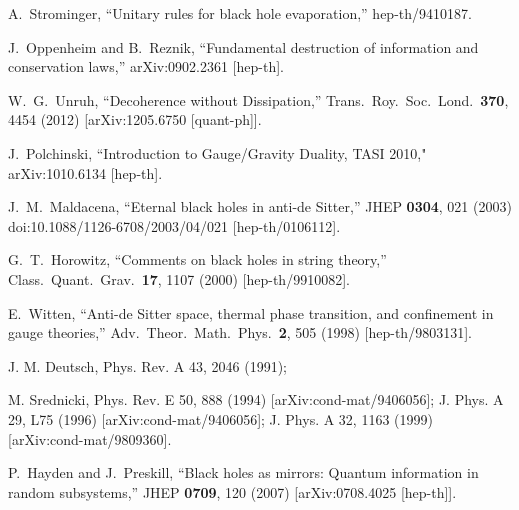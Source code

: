 \documentclass[12pt]{article}
\begin{document}
\begin{thebibliography}{99}
  
  A.~Strominger,
  ``Unitary rules for black hole evaporation,''
  hep-th/9410187. 
    
  J.~Oppenheim and B.~Reznik,
  ``Fundamental destruction of information and conservation laws,''
  arXiv:0902.2361 [hep-th].
 
  W.~G.~Unruh,
  ``Decoherence without Dissipation,''
  Trans.\ Roy.\ Soc.\ Lond.\  {\bf 370}, 4454 (2012)
  [arXiv:1205.6750 [quant-ph]].
  
  J.~Polchinski,
  ``Introduction to Gauge/Gravity Duality, TASI 2010,"
   arXiv:1010.6134 [hep-th].
  
  
  J.~M.~Maldacena,
  ``Eternal black holes in anti-de Sitter,''
  JHEP {\bf 0304}, 021 (2003)
  doi:10.1088/1126-6708/2003/04/021
  [hep-th/0106112].
  
  G.~T.~Horowitz,
  ``Comments on black holes in string theory,''
  Class.\ Quant.\ Grav.\  {\bf 17}, 1107 (2000)
  [hep-th/9910082].
  
  E.~Witten,
  ``Anti-de Sitter space, thermal phase transition, and confinement in gauge theories,''
  Adv.\ Theor.\ Math.\ Phys.\  {\bf 2}, 505 (1998)
  [hep-th/9803131].
  
J. M. Deutsch, Phys. Rev. A 43, 2046 (1991);

M. Srednicki, Phys. Rev. E 50, 888 (1994) [arXiv:cond-mat/9406056]; J. Phys. A 29, L75 (1996)
[arXiv:cond-mat/9406056]; J. Phys. A 32, 1163 (1999) [arXiv:cond-mat/9809360].

  P.~Hayden and J.~Preskill,
  ``Black holes as mirrors: Quantum information in random subsystems,''
  JHEP {\bf 0709}, 120 (2007)
  [arXiv:0708.4025 [hep-th]].
  

\end{thebibliography}
\end{document}
